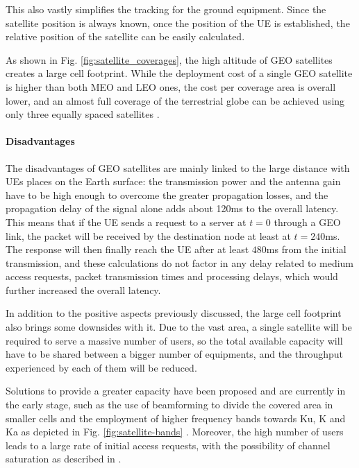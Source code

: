This also vastly simplifies the tracking for the ground equipment. Since the satellite position is always known, once the position of the \ac{UE} is established, the relative position of the satellite can be easily calculated.

As shown in Fig. \ref{fig:satellite_coverages}, the high altitude of \ac{GEO} satellites creates a large cell footprint. While the deployment cost of a single \ac{GEO} satellite is higher than both \ac{MEO} and \ac{LEO} ones, the cost per coverage area is overall lower, and an almost full coverage of the terrestrial globe can be achieved using only three equally spaced satellites \cite{types-of-orbits-esa}.

\paragraph{Disadvantages}
The disadvantages of \ac{GEO} satellites are mainly linked to the large distance with \ac{UE}s places on the Earth surface: the transmission power and the antenna gain have to be high enough to overcome the greater propagation losses, and the propagation delay of the signal alone adds about 120ms to the overall latency. This means that if the \ac{UE} sends a request to a server at $t=0$ through a \ac{GEO} link, the packet will be received by the destination node at least at $t=240$ms. The response will then finally reach the \ac{UE} after at least $480$ms from the initial transmission, and these calculations do not factor in any delay related to medium access requests, packet transmission times and processing delays, which would further increased the overall latency.

In addition to the positive aspects previously discussed, the large cell footprint also brings some downsides with it. Due to the vast area, a single satellite will be required to serve a massive number of users, so the total available capacity will have to be shared between a bigger number of equipments, and the throughput experienced by each of them will be reduced.

Solutions to provide a greater capacity have been proposed and are currently in the early stage, such as the use of beamforming to divide the covered area in smaller cells and the employment of higher frequency bands towards Ku, K and Ka as depicted in Fig. \ref{fig:satellite-bands} \cite{advances-comm-sat-sys}.
Moreover, the high number of users leads to a large rate of initial access requests, with the possibility of channel saturation as described in \cite{3gpp-tr-38.811}.

